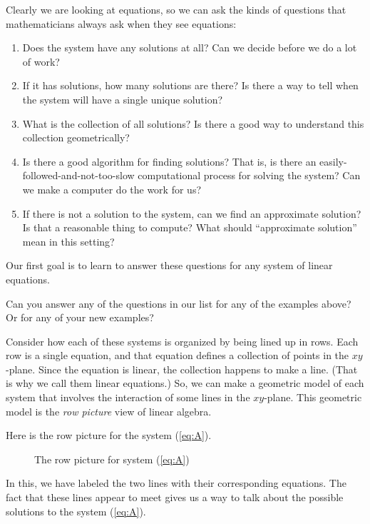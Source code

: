 \documentclass[elementsmain.tex]{subfiles}
\begin{document}
Clearly we are looking at equations, so we can ask the kinds of questions that mathematicians always ask when they see equations:
\begin{enumerate}
\item Does the system have any solutions at all? Can we decide before we do a lot of work?
\item If it has solutions, how many solutions are there? Is there a way to tell when the system will have a single unique solution?
\item What is the collection of all solutions? Is there a good way to understand this collection geometrically?
\item Is there a good algorithm for finding solutions? That is, is there an easily-followed-and-not-too-slow computational process for solving the system? Can we make a computer do the work for us?
\item If there is not a solution to the system, can we find an approximate solution? 
Is that a reasonable thing to compute? What should ``approximate solution'' mean in this setting?
\end{enumerate}

Our first goal is to learn to answer these questions for any system of linear equations. 


\begin{readingex}
Can you answer any of the questions in our list for any of the examples above? Or for any of your new examples?
\end{readingex}

Consider how each of these systems is organized by being lined up in rows. 
Each row is a single equation, and that equation defines a collection of points in the $xy$-plane. Since the equation is linear, the collection happens to make a line. (That is why we call them linear equations.) So, we can make a geometric model of each system that involves the interaction of some lines in the $xy$-plane. This geometric model is the \emph{row picture} view of linear algebra. 

Here is the row picture for the system (\ref{eq:A}).
\begin{figure}[h!]
\centering
{}
\caption{The row picture for system (\ref{eq:A})}
\label{fig:rowpic-B}
\end{figure}
In this, we have labeled the two lines with their corresponding equations. The fact that these lines appear to meet gives us a way to talk about the possible solutions to the system (\ref{eq:A}).
\end{document}
